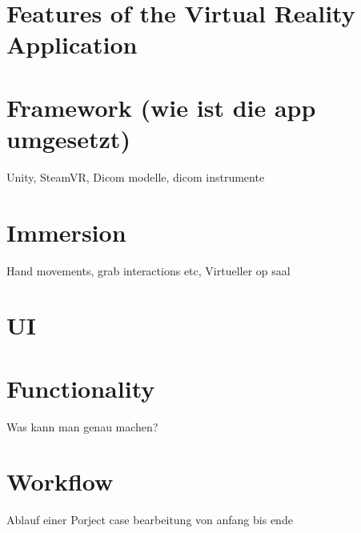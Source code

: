 \section{\label{sec::Features}Features of the Virtual Reality Application}


\section{\label{sec::Features}Framework (wie ist die app umgesetzt)}
Unity, SteamVR, Dicom modelle, dicom instrumente

\section{\label{sec::Features}Immersion}
Hand movements, grab interactions etc, Virtueller op saal

\section{\label{sec::Features}UI}

\section{\label{sec::Features}Functionality}
Was kann man genau machen?

\section{\label{sec::Features}Workflow}
Ablauf einer Porject case bearbeitung von anfang bis ende